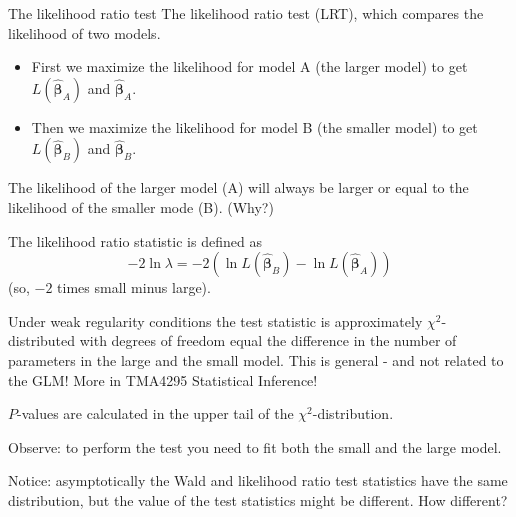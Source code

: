 \documentclass[
  ignorenonframetext,
]{beamer}
\providecommand{\tightlist}{%
  \setlength{\itemsep}{0pt}\setlength{\parskip}{0pt}}
\begin{document}
\begin{frame}
\begin{block}{The likelihood ratio test}
\protect\hypertarget{the-likelihood-ratio-test}{}
The likelihood ratio test (LRT), which compares the likelihood of two
models.

\begin{itemize}
\tightlist
\item
  First we maximize the likelihood for model A (the larger model) to get
  \(L(\hat{\boldsymbol{\beta}}_A)\) and \(\hat{\boldsymbol{\beta}}_A\).
\item
  Then we maximize the likelihood for model B (the smaller model) to get
  \(L(\hat{\boldsymbol{\beta}}_B)\) and \(\hat{\boldsymbol{\beta}}_B\).
\end{itemize}
\end{block}
\end{frame}

\begin{frame}
The likelihood of the larger model (A) will always be larger or equal to
the likelihood of the smaller mode (B). (Why?)

The likelihood ratio statistic is defined as
\[- 2\ln \lambda=-2(\ln L(\hat{\boldsymbol{\beta}}_B)-\ln L(\hat{\boldsymbol{\beta}}_A)) \]
(so, \(-2\) times small minus large).
\end{frame}

\begin{frame}
Under weak regularity conditions the test statistic is approximately
\(\chi^2\)-distributed with degrees of freedom equal the difference in
the number of parameters in the large and the small model. This is
general - and not related to the GLM! More in TMA4295 Statistical
Inference!

\(P\)-values are calculated in the upper tail of the
\(\chi^2\)-distribution.

Observe: to perform the test you need to fit both the small and the
large model.

Notice: asymptotically the Wald and likelihood ratio test statistics
have the same distribution, but the value of the test statistics might
be different. How different?
\end{frame}
\end{document}
